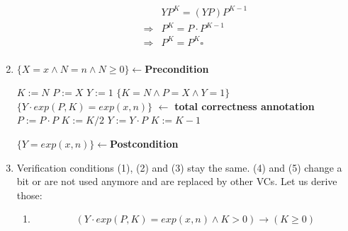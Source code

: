 \documentclass[a4paper]{article}
\begin{document}
\begin{enumerate}[label=(\alph*)]
\begin{enumerate}[label=(\arabic*)]
\begin{align*}
            &YP^K=(YP)P^{K-1}\\
            \Rightarrow&P^K=P\cdot P^{K-1}\\
            \Rightarrow&P^K=P^{K}\square\\
        \end{align*}
    \end{enumerate}
    \newpage
    \item
    $\{X=x\wedge N=n\wedge N\ge 0\}\leftarrow$\textbf{Precondition}
    \begin{algorithmic}
    \State $K:=N$
    \State $P:=X$
    \State $Y:=1$
    \State $\{K=N\wedge P=X\wedge Y=1\}$
    \State $\{Y\cdot exp(P,K)=exp(x,n)\}$
    \State [$K$] $\leftarrow$ \textbf{total correctness annotation}
    \State $P:=P\cdot P$
    \State $K:=K/2$
    \Else
    \State $Y:=Y\cdot P$
    \State $K:=K-1$
    \end{algorithmic}
    $\{Y=exp(x,n)\}\leftarrow$\textbf{Postcondition}\\
    
    \item Verification conditions (1), (2) and (3) stay the same. (4) and (5) change a bit or are not used anymore and are replaced by other VCs. Let us derive those:
    \begin{enumerate}[label=(\arabic*)]
        \item 
        \begin{align*}
            (Y\cdot exp(P,K)=exp(x,n)\wedge K>0)\rightarrow (K\ge 0)    
        \end{align*}
        

\end{enumerate}
\end{enumerate}
\end{document}
